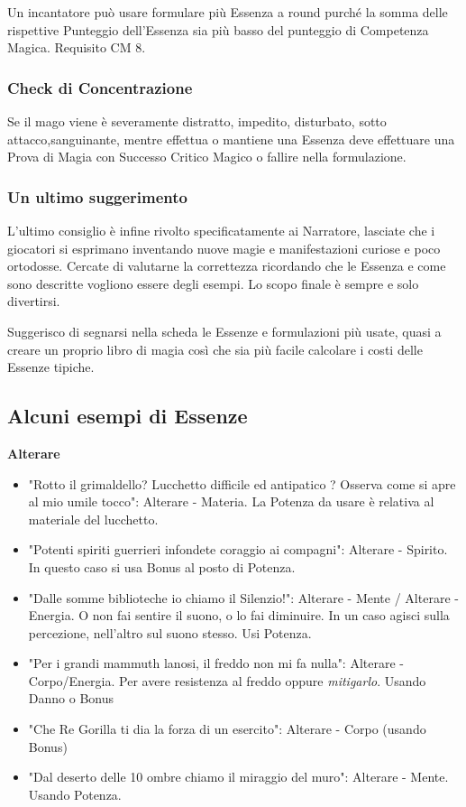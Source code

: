 \documentclass[a4paper,twoside,openany]{book}
\begin{document}
\begin{multicols}{2}
Un incantatore può usare formulare più Essenza a round purché la somma delle rispettive Punteggio dell'Essenza sia più basso del punteggio di Competenza Magica. Requisito CM 8.


\subsubsection{Check di Concentrazione}

Se il mago viene è severamente distratto, impedito, disturbato, sotto attacco,sanguinante, mentre effettua o mantiene una Essenza deve effettuare una Prova di Magia con Successo Critico Magico o fallire nella formulazione.


\subsubsection{Un ultimo suggerimento}

L'ultimo consiglio è infine rivolto specificatamente ai Narratore, lasciate che i giocatori si esprimano inventando nuove magie e manifestazioni curiose e poco ortodosse. Cercate di valutarne la correttezza ricordando che le Essenza e come sono descritte vogliono essere degli esempi. Lo scopo finale è sempre e solo divertirsi.


\bigskip

Suggerisco di segnarsi nella scheda le Essenze e formulazioni più usate, quasi a creare un proprio libro di magia così che sia più facile calcolare i costi delle Essenze tipiche.

\bigskip



\subsection{Alcuni esempi di Essenze}


\textbf{Alterare}

\begin{itemize}[leftmargin=*] \setlength{\itemsep}{0pt}	
	\item "Rotto il grimaldello? Lucchetto difficile ed antipatico ? Osserva come si apre al mio umile tocco": Alterare - Materia. La Potenza da usare è relativa al materiale del lucchetto.
	\item "Potenti spiriti guerrieri infondete coraggio ai compagni": Alterare - Spirito. In questo caso si usa Bonus al posto di Potenza.
	\item "Dalle somme biblioteche io chiamo il Silenzio!": Alterare - Mente / Alterare - Energia. O non fai sentire il suono, o lo fai diminuire. In un caso agisci sulla percezione, nell'altro sul suono stesso. Usi Potenza.
	\item "Per i grandi mammuth lanosi, il freddo non mi fa nulla": Alterare - Corpo/Energia. Per avere resistenza al freddo oppure \emph{mitigarlo}. Usando Danno o Bonus
	\item "Che Re Gorilla ti dia la forza di un esercito": Alterare - Corpo (usando Bonus)
	\item "Dal deserto delle 10 ombre chiamo il miraggio del muro": Alterare - Mente. Usando Potenza.
\end{itemize}	


\end{multicols}
\end{document}
